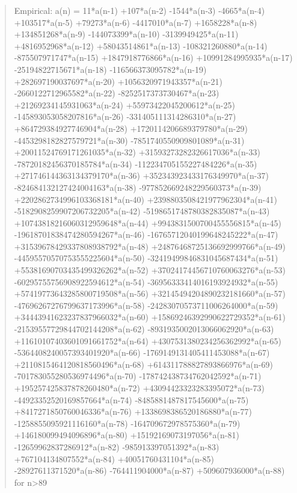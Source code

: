 \documentclass[11pt]{article}
\theoremstyle{definition}
\begin{document}
\begin{quote}\ttfamily Empirical: a(n) = 11*a(n-1) +107*a(n-2) -1544*a(n-3) -4665*a(n-4) +103517*a(n-5) +79273*a(n-6) -4417010*a(n-7) +1658228*a(n-8) +134851268*a(n-9) -144073399*a(n-10) -3139949425*a(n-11) +4816952968*a(n-12) +58043514861*a(n-13) -108321260880*a(n-14) -875507971747*a(n-15) +1847918776866*a(n-16) +10991284995935*a(n-17) -25194822715671*a(n-18) -116566373095782*a(n-19) +282697190037697*a(n-20) +1056320971943357*a(n-21) -2660122712965582*a(n-22) -8252517373730467*a(n-23) +21269234145931063*a(n-24) +55973422045200612*a(n-25) -145893053058207816*a(n-26) -331405111314286310*a(n-27) +864729384927746904*a(n-28) +1720114206689379780*a(n-29) -4453298182827579721*a(n-30) -7851740550909801089*a(n-31) +20011524769171261035*a(n-32) +31593273282326617036*a(n-33) -78720182456370185784*a(n-34) -112234705155227484226*a(n-35) +271746144363134379170*a(n-36) +352343923433176349970*a(n-37) -824684132127424004163*a(n-38) -977852669248229560373*a(n-39) +2202862734996103368181*a(n-40) +2398803508421977962304*a(n-41) -5182908259907206732205*a(n-42) -5198651748780382835087*a(n-43) +10743818216060312959648*a(n-44) +9943831500700455556815*a(n-45) -19618701838474280594267*a(n-46) -16765712040199648245222*a(n-47) +31539678429337808938792*a(n-48) +24876468725136692999766*a(n-49) -44595570570753555225604*a(n-50) -32419499846831045687434*a(n-51) +55381690703435499326262*a(n-52) +37024174456710760063276*a(n-53) -60295755756908922594612*a(n-54) -36956333414016193924932*a(n-55) +57419773643285800719508*a(n-56) +32145494204890232181660*a(n-57) -47696267276799637173996*a(n-58) -24283070573711006264000*a(n-59) +34443941623237837966032*a(n-60) +15869246392990622729352*a(n-61) -21539557729844702144208*a(n-62) -8931935002013066062920*a(n-63) +11610107403601091661752*a(n-64) +4307531380234256362992*a(n-65) -5364408240057393401920*a(n-66) -1769149131405411453088*a(n-67) +2110815464120818560496*a(n-68) +614311788827893866976*a(n-69) -701783055280536974496*a(n-70) -178742438734762042592*a(n-71) +195257425837878260480*a(n-72) +43094423323283395072*a(n-73) -44923352520169857664*a(n-74) -8485881487817545600*a(n-75) +8417271850760046336*a(n-76) +1338698386520186880*a(n-77) -1258855095921116160*a(n-78) -164709672978575360*a(n-79) +146180099494096896*a(n-80) +15192169073197056*a(n-81) -12659962837286912*a(n-82) -985913397051392*a(n-83) +767104134807552*a(n-84) +40051760431104*a(n-85) -28927611371520*a(n-86) -764411904000*a(n-87) +509607936000*a(n-88) for n>89\end{quote}
\end{document}
